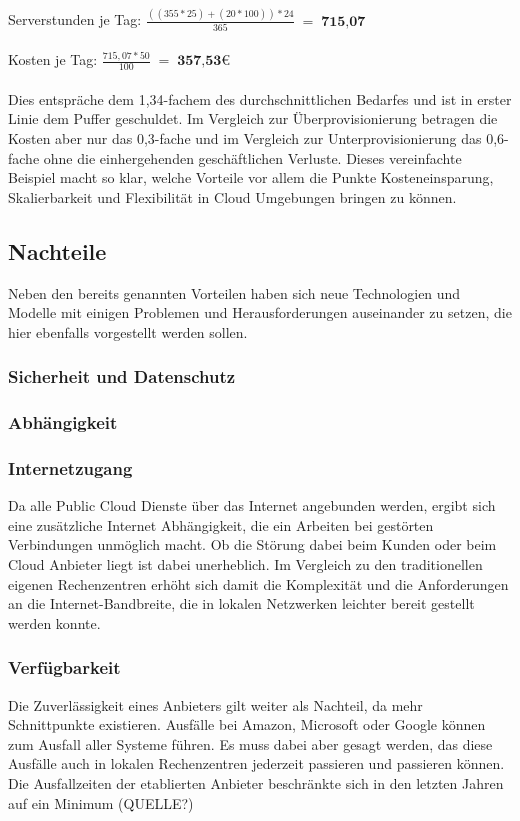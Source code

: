 \\
\\
Serverstunden je Tag:    $\displaystyle \frac{((355 * 25) + (20 * 100)) * 24}{365}\; =\; \textbf{715,07}	 $\\
\\
Kosten je Tag:           $\displaystyle \frac{715,07 * 50}{100}\; =\; \textbf{357,53€} $\\
\\
Dies entspräche dem 1,34-fachem des durchschnittlichen Bedarfes und ist in erster Linie dem Puffer geschuldet. Im Vergleich zur Überprovisionierung betragen die Kosten aber nur das 0,3-fache und im Vergleich zur Unterprovisionierung das 0,6-fache ohne die einhergehenden geschäftlichen Verluste.
Dieses vereinfachte Beispiel macht so klar, welche Vorteile vor allem die Punkte Kosteneinsparung, Skalierbarkeit und Flexibilität in Cloud Umgebungen bringen zu können.

\subsection{Nachteile}
Neben den bereits genannten Vorteilen haben sich neue Technologien und Modelle mit einigen Problemen und Herausforderungen auseinander zu setzen, die hier ebenfalls vorgestellt werden sollen.
\subsubsection{Sicherheit und Datenschutz}

\subsubsection{Abhängigkeit}

\subsubsection{Internetzugang}
Da alle Public Cloud Dienste über das Internet angebunden werden, ergibt sich eine zusätzliche Internet Abhängigkeit, die ein Arbeiten bei gestörten Verbindungen unmöglich macht. Ob die Störung dabei beim Kunden oder beim Cloud Anbieter liegt ist dabei unerheblich. Im Vergleich zu den traditionellen eigenen Rechenzentren erhöht sich damit die Komplexität und die Anforderungen an die Internet-Bandbreite, die in lokalen Netzwerken leichter bereit gestellt werden konnte.
\subsubsection{Verfügbarkeit}
Die Zuverlässigkeit eines Anbieters gilt weiter als Nachteil, da mehr Schnittpunkte existieren. Ausfälle bei Amazon, Microsoft oder Google können zum Ausfall aller Systeme führen. Es muss dabei aber gesagt werden, das diese Ausfälle auch in lokalen Rechenzentren jederzeit passieren und passieren können. Die Ausfallzeiten der etablierten Anbieter beschränkte sich in den letzten Jahren auf ein Minimum (QUELLE?)

